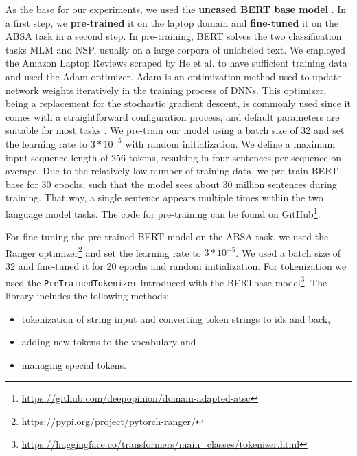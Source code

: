 As the base for our experiments, we used the \textbf{uncased BERT base model} \cite{DBLP:journals/corr/abs-1810-04805}. In a first step, we \textbf{pre-trained} it on the laptop domain and \textbf{fine-tuned} it on the ABSA task in a second step. In pre-training, BERT solves the two classification tasks MLM and NSP, usually on a large corpora of unlabeled text. We employed the Amazon Laptop Reviews scraped by He et al. to have sufficient training data \cite{he2016ups} and used the Adam optimizer. Adam is an optimization method used to update network weights iteratively in the training process of DNNs. This optimizer, being a replacement for the stochastic gradient descent, is commonly used since it comes with a straightforward configuration process, and default parameters are suitable for most tasks \cite{kingma2014adam}. We pre-train our model using a batch size of 32 and set the learning rate to $3 * 10^{-5}$ with random initialization.
We define a maximum input sequence length of 256 tokens, resulting in four sentences per sequence on average.  Due to the relatively low number of training data, we pre-train BERT base for 30 epochs, such that the model sees about 30 million sentences during training. That way, a single sentence appears multiple times within the two language model tasks. The code for pre-training can be found on GitHub\footnote{\url{https://github.com/deepopinion/domain-adapted-atsc}}.

For fine-tuning the pre-trained BERT model on the ABSA task, we used the Ranger optimizer\footnote{\url{https://pypi.org/project/pytorch-ranger/}} and set the learning rate to $3 * 10^{-5}$. We used a batch size of 32 and fine-tuned it for 20 epochs and random initialization. 
For tokenization we used the \texttt{PreTrainedTokenizer} introduced with the BERTbase model\footnote{\url{https://huggingface.co/transformers/main\_classes/tokenizer.html}}. The library includes the following methods:
\begin{itemize}
\item tokenization of string input and converting token strings to ids and back,
\item adding new tokens to the vocabulary and
\item managing special tokens.
\end{itemize}


